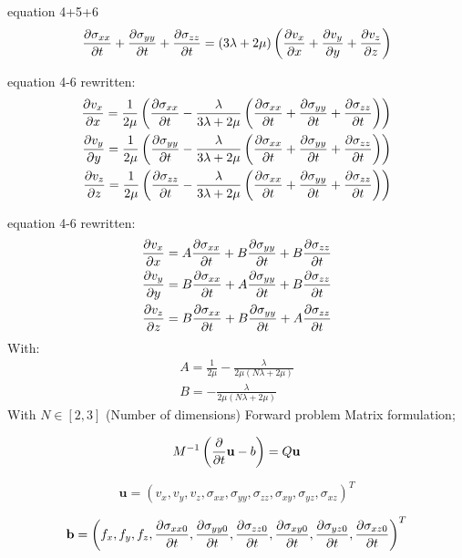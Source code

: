 \documentclass[pdftex,a4paper,parskip,listof=totoc,bibliography=totoc,onehalfspacing,12pt]{scrreprt}
\begin{document}
equation 4+5+6
\begin{equation}
 \pdv{\sigma_{xx}}{t}+\pdv{\sigma_{yy}}{t}+\pdv{\sigma_{zz}}{t}=\left(3\lambda+2\mu\right)\left(\pdv{v_x}{x}+\pdv{v_y}{y}+ \pdv{v_z}{z}\right)
\end{equation}


equation 4-6 rewritten:
\begin{align}
\pdv{v_x}{x}=\frac{1}{2\mu} \left(\pdv{\sigma_{xx}}{t} - \frac{\lambda}{3\lambda+2\mu} \left(\pdv{\sigma_{xx}}{t}+\pdv{\sigma_{yy}}{t}+\pdv{\sigma_{zz}}{t}\right)\right)\\
\pdv{v_y}{y}=\frac{1}{2\mu} \left(\pdv{\sigma_{yy}}{t} - \frac{\lambda}{3\lambda+2\mu} \left(\pdv{\sigma_{xx}}{t}+\pdv{\sigma_{yy}}{t}+\pdv{\sigma_{zz}}{t}\right)\right)\\
\pdv{v_z}{z}=\frac{1}{2\mu} \left(\pdv{\sigma_{zz}}{t} - \frac{\lambda}{3\lambda+2\mu} \left(\pdv{\sigma_{xx}}{t}+\pdv{\sigma_{yy}}{t}+\pdv{\sigma_{zz}}{t}\right)\right)
\end{align}

equation 4-6 rewritten:
\begin{align}
\pdv{v_x}{x}=A\pdv{\sigma_{xx}}{t} + B \pdv{\sigma_{yy}}{t}+B\pdv{\sigma_{zz}}{t}\\
\pdv{v_y}{y}=B\pdv{\sigma_{xx}}{t} + A \pdv{\sigma_{yy}}{t}+B\pdv{\sigma_{zz}}{t}\\
\pdv{v_z}{z}= B\pdv{\sigma_{xx}}{t} + B \pdv{\sigma_{yy}}{t}+A\pdv{\sigma_{zz}}{t}
\end{align}
With:
\begin{align}
A=\frac{1}{2\mu}-\frac{\lambda}{2\mu(N\lambda+2\mu)}\\
B=-\frac{\lambda}{2\mu(N\lambda+2\mu)}
\end{align}
With $N\in[2,3]$ (Number of dimensions)
Forward problem Matrix formulation;

\begin{equation}
 M^{-1}\left( \pdv{}{t}\mathbf{u}-b \right) =Q\mathbf{u}
\end{equation}


\begin{equation}
\mathbf{u}=\left(v_x,v_y,v_z,\sigma_{xx},\sigma_{yy},\sigma_{zz},\sigma_{xy},\sigma_{yz} ,\sigma_{xz} \right)^T
\end{equation}

\begin{equation}
\mathbf{b}=\left(f_x,f_y,f_z,\pdv{\sigma_{xx0}}{t},\pdv{\sigma_{yy0}}{t},\pdv{\sigma_{zz0}}{t},\pdv{\sigma_{xy0}}{t},\pdv{\sigma_{yz0}}{t},\pdv{\sigma_{xz0}}{t}\right)^T
\end{equation}
\end{document}
